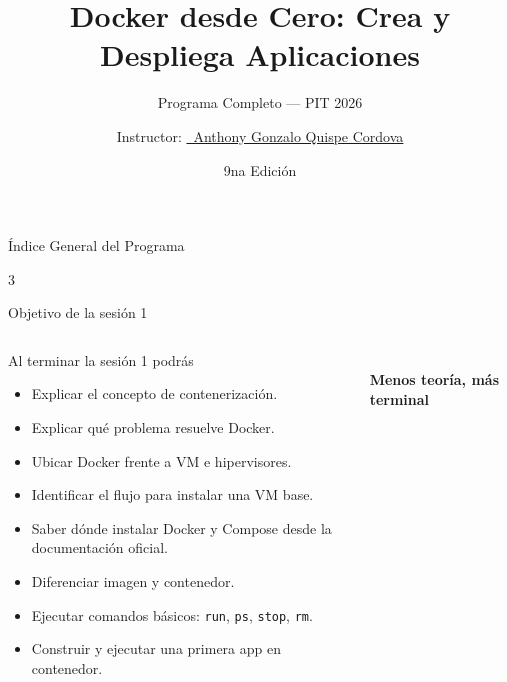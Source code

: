 \documentclass[aspectratio=169]{beamer}
\title[Docker desde Cero]{Docker desde Cero: Crea y Despliega Aplicaciones}
\subtitle{Programa Completo — PIT 2026}
\author[Anthony Gonzalo Quispe Cordova]{Instructor: \href{https://www.linkedin.com/in/anthony-gonzalo-quispe-cordova-a39274196}{\texorpdfstring{\color{linkedinblue}\faLinkedin\ Anthony Gonzalo Quispe Cordova}{Anthony Gonzalo Quispe Cordova}}}
\institute[OTI]{Oficina de Tecnologías de la Información (OTI)}
\date{9na Edición}
\begin{document}
\begin{frame}[plain]
  \titlepage
\end{frame}

\begin{frame}{Índice General del Programa}
  \tiny
  \setlength{\columnsep}{0.25cm}
  \begin{multicols}{3}
    \tableofcontents[hideallsubsections]
  \end{multicols}
\end{frame}


\begin{frame}{Objetivo de la sesión 1}
  \footnotesize
  \begin{columns}[c]
    \begin{block}{Al terminar la sesión 1 podrás}
      \begin{itemize}
        \item Explicar el concepto de contenerización.
        \item Explicar qué problema resuelve Docker.
        \item Ubicar Docker frente a VM e hipervisores.
        \item Identificar el flujo para instalar una VM base.
        \item Saber dónde instalar Docker y Compose desde la documentación oficial.
        \item Diferenciar imagen y contenedor.
        \item Ejecutar comandos básicos: \texttt{run}, \texttt{ps}, \texttt{stop}, \texttt{rm}.
        \item Construir y ejecutar una primera app en contenedor.
      \end{itemize}
    \end{block}
    \centering
    {\color{dockerblue}\fontsize{44}{50}\selectfont\faDocker}\\[0.15cm]
    {\small\textbf{Menos teoría, más terminal}}
  \end{columns}
\end{frame}
\end{document}
